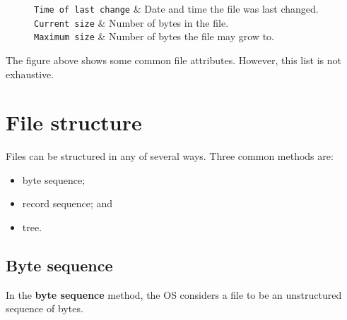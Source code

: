 \documentclass[a4paper]{systems-software}
\begin{document}
\begin{figure}[H]
{\begin{minipage}{\dimexpr \textwidth-2\fboxsep-2\fboxrule}
\begin{longtabu}
	    \texttt{Time of last change} & Date and time the file was last changed. 
	    \\ \hline
	    \texttt{Current size} & Number of bytes in the file.
	    \\ \hline
	    \texttt{Maximum size} & Number of bytes the file may grow to.
		\\ \hline
	\end{longtabu}
  \end{minipage}}
\end{figure}

The figure above shows some common file attributes. However, this list is not exhaustive.


\section*{File structure}

Files can be structured in any of several ways. Three common methods are:
\begin{itemize}
	\item byte sequence;
	\item record sequence; and
	\item tree.
\end{itemize}


\newpage

\subsection*{Byte sequence}

In the \textbf{byte sequence} method, the OS considers a file to be an unstructured sequence of bytes.
\end{document}
